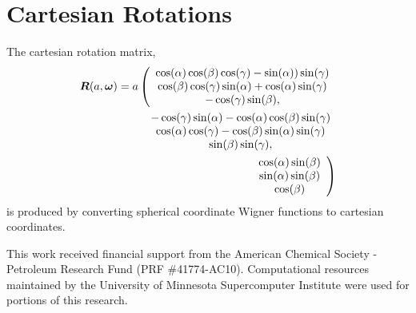 \documentclass[preprint]{revtex4}              %
\newcommand{\mb}[1]{\ensuremath{\mbox{\boldmath $ #1 $}}}
\begin{document}

\appendix

\section{Cartesian Rotations}
\label{cartRot}

The cartesian rotation matrix,
\begin{eqnarray}
\mb{R}(a,\mb{\omega})=a\left(\begin{array}{c}\cos(\alpha)\cos(\beta)\cos(\gamma)
- \sin(\alpha))\sin(\gamma) \\
\cos(\beta)\cos(\gamma)\sin(\alpha) + \cos(\alpha)\sin(\gamma) \\
    -\cos(\gamma) \sin(\beta),\end{array} \right. \nonumber\\
%
\begin{array}{c}-\cos(\gamma)\sin(\alpha)-\cos(\alpha) \cos(\beta) \sin(\gamma)\\
\cos(\alpha)\cos(\gamma) - \cos(\beta)\sin(\alpha)\sin(\gamma) \\
    \sin(\beta) \sin(\gamma),\end{array} \nonumber\\
%
\left. \begin{array}{c}\cos(\alpha) \sin(\beta)\\
\sin(\alpha) \sin(\beta)\\
    \cos(\beta)\end{array}\right)
\end{eqnarray}
is produced by converting spherical coordinate Wigner functions to
cartesian coordinates.




\begin{acknowledgments}
This work received financial support from the American Chemical
Society - Petroleum Research Fund (PRF \#41774-AC10).
%
Computational resources maintained by the University of Minnesota
Supercomputer Institute were used for portions of this research.
\end{acknowledgments}
\end{document}
